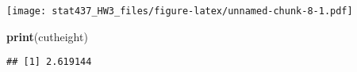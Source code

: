 \documentclass[
]{article}
\newenvironment{Shaded}{\begin{snugshade}}{\end{snugshade}}
\newcommand{\FunctionTok}[1]{\textcolor[rgb]{0.13,0.29,0.53}{\textbf{#1}}}
\newcommand{\NormalTok}[1]{#1}
\begin{document}
\texttt{[image: stat437\_HW3\_files/figure-latex/unnamed-chunk-8-1.pdf]}

\begin{Shaded}
\begin{Highlighting}[]
\FunctionTok{print}\NormalTok{(cutheight)}
\end{Highlighting}
\end{Shaded}

\begin{verbatim}
## [1] 2.619144
\end{verbatim}
\end{document}
